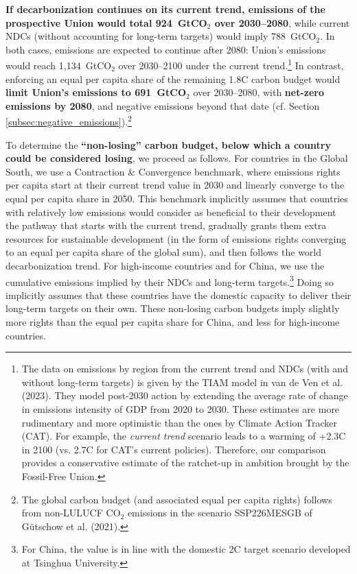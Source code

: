 \documentclass[12pt,english]{article}
\begin{document}
\textbf{If decarbonization continues on its current trend, emissions of the prospective Union would total 924~GtCO$_\text{2}$ over 2030--2080}, while current NDCs (without accounting for long-term targets) would imply 788~GtCO$_\text{2}$. In both cases, emissions are expected to continue after 2080: Union's emissions would reach 1,134~GtCO$_\text{2}$ over 2030--2100 under the current trend.\footnote{The data on emissions by region from the current trend and NDCs (with and without long-term targets) is given by the TIAM model in van de Ven et al. (2023)\cite{van_de_ven_multimodel_2023}. They model post-2030 action by extending the average rate of change in emissions intensity of GDP from 2020 to 2030. These estimates are more rudimentary and more optimistic than the ones by Climate Action Tracker (CAT). For example, the \textit{current trend} scenario leads to a warming of +2.3\textdegree{}C in 2100 (vs. 2.7\textdegree{}C for CAT's current policies). Therefore, our comparison provides a conservative estimate of the ratchet-up in ambition brought by the Fossil-Free Union.} %
In contrast, enforcing an equal per capita share of the remaining 1.8\textdegree{}C carbon budget would \textbf{limit Union's emissions to 691~GtCO$_\text{2}$} over 2030--2080, with \textbf{net-zero emissions by 2080}, and negative emissions beyond that date (cf. Section \ref{subsec:negative_emissions}).\footnote{The global carbon budget (and associated equal per capita rights) follows from non-LULUCF CO$_\text{2}$ emissions in the scenario SSP226MESGB of Gütschow et al. (2021).\cite{gutschow_country-resolved_2021}} %

To determine the \textbf{``non-losing'' carbon budget, below which a country could be considered losing}, we proceed as follows. For countries in the Global South, %
we use a Contraction \& Convergence benchmark, where emissions rights per capita start at their current trend value in 2030 and linearly converge to the equal per capita share in 2050. %
This benchmark implicitly assumes that countries with relatively low emissions would consider as beneficial to their development the pathway that starts with the current trend, gradually grants them extra resources for sustainable development (in the form of emissions rights converging to an equal per capita share of the global sum), and then follows the world decarbonization trend. 
For high-income countries and for China, we use the cumulative emissions implied by their NDCs and long-term targets.\footnote{For China, the value is in line with the domestic 2\textdegree{}C target scenario developed at Tsinghua University.\cite{he_towards_2022}} Doing so implicitly assumes that these countries have the domestic capacity to deliver their long-term targets on their own. These non-losing carbon budgets imply slightly more rights than the equal per capita share for China, and less for high-income countries. 
\end{document}
